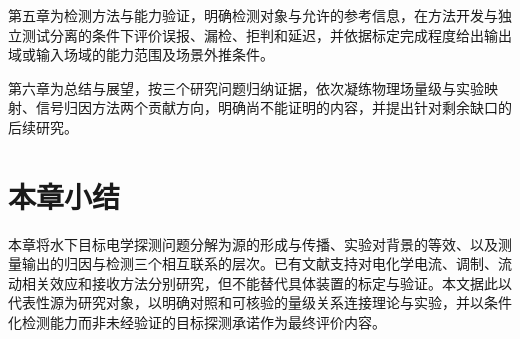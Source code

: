 第五章为检测方法与能力验证，明确检测对象与允许的参考信息，在方法开发与独立测试分离的条件下评价误报、漏检、拒判和延迟，并依据标定完成程度给出输出域或输入场域的能力范围及场景外推条件。

第六章为总结与展望，按三个研究问题归纳证据，依次凝练物理场量级与实验映射、信号归因方法两个贡献方向，明确尚不能证明的内容，并提出针对剩余缺口的后续研究。

\section{本章小结}

本章将水下目标电学探测问题分解为源的形成与传播、实验对背景的等效、以及测量输出的归因与检测三个相互联系的层次。已有文献支持对电化学电流、调制、流动相关效应和接收方法分别研究，但不能替代具体装置的标定与验证。本文据此以代表性源为研究对象，以明确对照和可核验的量级关系连接理论与实验，并以条件化检测能力而非未经验证的目标探测承诺作为最终评价内容。
